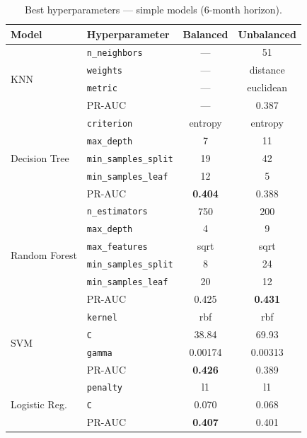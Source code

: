 \clearpage
\begin{table}[ht!]
\centering
\caption[Best hyperparameters: simple models]{Best hyperparameters --- simple models (6-month horizon).}
\label{tab:best_simple}
\small
\begin{tabular}{l l c c}
\toprule
\textbf{Model} & \textbf{Hyperparameter} & \textbf{Balanced} & \textbf{Unbalanced} \\
\midrule
\multirow{4}{*}{KNN}
  & \texttt{n\_neighbors}      & ---   & 51 \\
  & \texttt{weights}           & ---   & distance \\
  & \texttt{metric}            & ---   & euclidean \\
  & PR-AUC                     & ---   & 0.387 \\
\midrule
\multirow{5}{*}{Decision Tree}
  & \texttt{criterion}         & entropy & entropy \\
  & \texttt{max\_depth}        & 7       & 11 \\
  & \texttt{min\_samples\_split} & 19    & 42 \\
  & \texttt{min\_samples\_leaf}  & 12    & 5 \\
  & PR-AUC                     & \textbf{0.404} & 0.388 \\
\midrule
\multirow{6}{*}{Random Forest}
  & \texttt{n\_estimators}     & 750   & 200 \\
  & \texttt{max\_depth}        & 4     & 9 \\
  & \texttt{max\_features}     & sqrt  & sqrt \\
  & \texttt{min\_samples\_split} & 8   & 24 \\
  & \texttt{min\_samples\_leaf}  & 20  & 12 \\
  & PR-AUC                     & 0.425 & \textbf{0.431} \\
\midrule
\multirow{4}{*}{SVM}
  & \texttt{kernel}            & rbf     & rbf \\
  & \texttt{C}                 & 38.84   & 69.93 \\
  & \texttt{gamma}             & 0.00174 & 0.00313 \\
  & PR-AUC                     & \textbf{0.426} & 0.389 \\
\midrule
\multirow{3}{*}{Logistic Reg.}
  & \texttt{penalty}           & l1    & l1 \\
  & \texttt{C}                 & 0.070 & 0.068 \\
  & PR-AUC                     & \textbf{0.407} & 0.401 \\
\bottomrule
\end{tabular}
\end{table}



